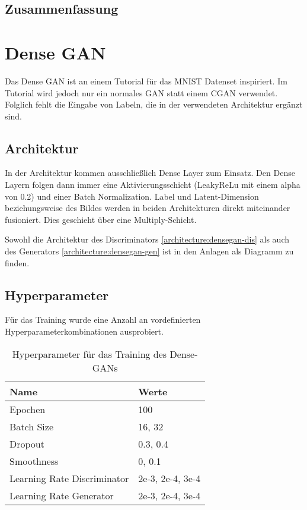 \subsection{Zusammenfassung}

\section{Dense GAN}
Das Dense GAN ist an einem Tutorial für das MNIST Datenset inspiriert.
Im Tutorial wird jedoch nur ein normales GAN statt einem CGAN verwendet.
Folglich fehlt die Eingabe von Labeln, die in der verwendeten Architektur ergänzt sind.

\subsection{Architektur}
In der Architektur kommen ausschließlich Dense Layer zum Einsatz.
Den Dense Layern folgen dann immer eine Aktivierungsschicht (LeakyReLu mit einem alpha von 0.2) und einer Batch Normalization.
Label und Latent-Dimension beziehungsweise des Bildes werden in beiden Architekturen direkt miteinander fusioniert.
Dies geschieht über eine Multiply-Schicht.

Sowohl die Architektur des Discriminators \cref{architecture:densegan-dis} als auch des Generators \cref{architecture:densegan-gen} ist in den Anlagen als Diagramm zu finden.

\subsection{Hyperparameter}
Für das Training wurde eine Anzahl an vordefinierten Hyperparameterkombinationen ausprobiert.

\begin{table}[H]
	\centering
	\begin{tabular}{l l}
		Name                        & Werte            \\ \hline
		Epochen                     & 100              \\
		Batch Size                  & 16, 32           \\
		Dropout                     & 0.3, 0.4         \\
		Smoothness                  & 0, 0.1           \\
		Learning Rate Discriminator & 2e-3, 2e-4, 3e-4 \\
		Learning Rate Generator     & 2e-3, 2e-4, 3e-4
	\end{tabular}
	\caption{Hyperparameter für das Training des Dense-GANs}
\end{table}

